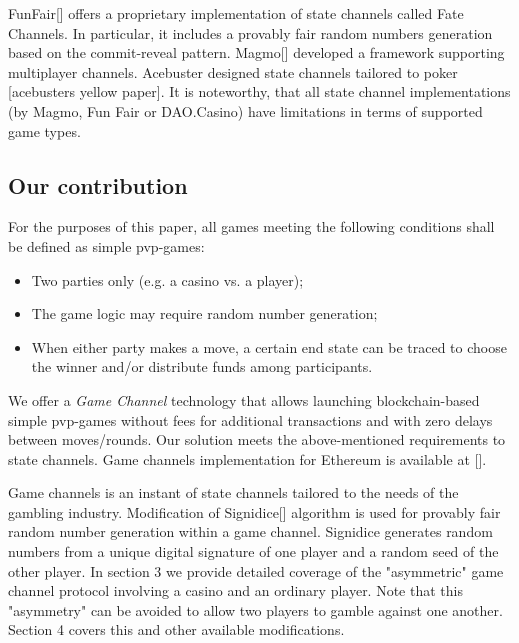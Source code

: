 	FunFair[] offers a proprietary implementation of state channels called Fate Channels. In particular, it includes a provably fair random numbers generation based on the commit-reveal pattern. Magmo[] developed a framework supporting multiplayer channels. Acebuster designed  state channels tailored to poker [acebusters yellow paper]. It is noteworthy, that all state channel implementations (by Magmo, Fun Fair or DAO.Casino) have limitations in terms of supported game types.

		\subsection {Our contribution}
	For the purposes of this paper, all games meeting the following conditions shall be defined as simple pvp-games:
	\begin{itemize}
		\item Two parties only (e.g. a casino vs. a player);
		\item The game logic may require random number generation;
		\item When either party makes a move, a certain end state can be traced to choose the winner and/or distribute funds among participants.
	\end{itemize}
	We offer a \textit {Game Channel} technology that allows launching blockchain-based simple pvp-games without fees for additional transactions and with zero delays between moves/rounds. Our solution meets the above-mentioned requirements to state channels. Game channels implementation for Ethereum is available at [].

	Game channels is an instant of state channels tailored to the needs of the gambling industry. Modification of Signidice[]
algorithm is used for provably fair random number generation within a game channel. Signidice generates random numbers from a unique digital signature of one player and a random seed of the other player. In section 3 we provide detailed coverage of the "asymmetric" game channel protocol involving a casino and an ordinary player. Note that this "asymmetry" can be avoided to allow two players to gamble against one another. Section 4 covers this and other available modifications.